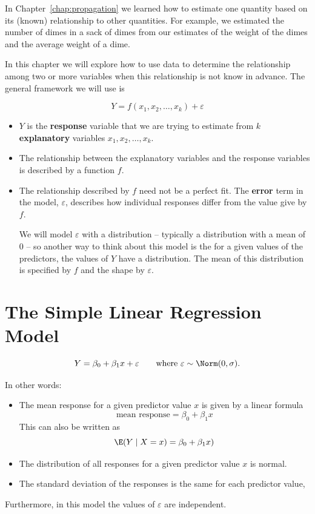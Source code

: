\documentclass[twoside]{book}\usepackage[]{graphicx}\usepackage[]{xcolor}
\def\term#1{\textbf{#1}}
\newcounter{example}[section]
\begin{document}
In Chapter~\ref{chap:propagation} we learned how to estimate one quantity based
on its (known) relationship to other quantities.  For example, we estimated the
number of dimes in a sack of dimes from our estimates of the weight of the
dimes and the average weight of a dime.  

In this chapter we will explore how to use data to determine the relationship among
two or more variables when this relationship is not know in advance.  The general
framework we will use is 

\[
Y = f(x_1, x_2, \dots, x_k) + \varepsilon
\]
\begin{itemize}
	\item $Y$ is the \term{response} variable that we are trying to estimate
		from $k$ \term{explanatory} variables $x_1, x_2, \dots, x_k$.
	\item
		The relationship between the explanatory variables and the response 
		variables is described by a function $f$.
	\item
		The relationship described by $f$ need not be a perfect fit.  The \term{error}
		term in the model, $\varepsilon$, describes how individual responses
		differ from the value give by $f$.  
		
		We will model $\varepsilon$ with a 
		distribution -- typically a distribution with a mean of 0 -- 
		so another way to think about this model is the for a given 
		values of the predictors, the values of $Y$ have a distribution.  The mean
		of this distribution is specified by $f$ and the shape by $\varepsilon$.
\end{itemize}


\section{The Simple Linear Regression Model}

\[
Y = \beta_0 + \beta_1 x + \varepsilon  \qquad \mbox{where $\varepsilon \sim \Norm(0,\sigma)$.}
\]

In other words:
\begin{itemize}
\item
The mean response for a given predictor value $x$ is given by a linear formula
\[
\mbox{mean response} = \beta_0 + \beta_1 x
\]
This can also be written as 
\[
\E(Y \mid X=x) = \beta_0 + \beta_1 x)
\]
\item
The distribution of all responses for a given predictor value $x$ is normal.
\item
The standard deviation of the responses is the same for each predictor value,
\end{itemize}
Furthermore, in this model the values of $\varepsilon$ are independent.
\end{document}
